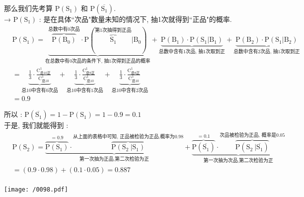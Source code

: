 \documentclass[UTF8]{ctexart}
\begin{document}
\begin{myEnvSample}
		那么我们先考算 $	\text{P}\left( \text{S}_1 \right) 	$ 和	$	\text{P}\left( \overline{\text{S}_1} \right) 	$. \\
		
		→ $	\text{P}\left( \text{S}_1 \right) 	$ : 是在具体``次品"数量未知的情况下, 抽1次就得到``正品"的概率. \\
		\begin{align*}  %
			&	\text{P}\left( \text{S}_1 \right) =\underset{\text{在总数中有0次品的条件下,\ 抽1次得到正品的概率}}{\underbrace{\overset{\text{总数中有0次品}}{\overbrace{\text{P}\left( \text{B}_0 \right) }}\cdot \text{P}\left( \overset{\text{第1次抽得到正品}}{\overbrace{\text{S}_1}}|\text{B}_0 \right) }}+\underset{\text{总数中含有1次品,\ 抽1次取到正}}{\underbrace{\text{P}\left( \text{B}_1 \right) \cdot \text{P}\left( \text{S}_1|\text{B}_1 \right) }}+\underset{\text{总数中含有2次品,\ 抽1次取到正}}{\underbrace{\text{P}\left( \text{B}_2 \right) \cdot \text{P}\left( \text{S}_1|\text{B}_2 \right) }}\\
			&=\underset{\text{总10中含有0次品}}{\underbrace{\frac{1}{3}\cdot \frac{\text{C}_{\text{总10正}}^{1}}{\text{C}_{\text{总}10}^{1}}}}+\underset{\text{总10中含有1次品}}{\underbrace{\frac{1}{3}\cdot \frac{\text{C}_{\text{总9正}}^{1}}{\text{C}_{\text{总}10}^{1}}}}+\underset{\text{总10中含有2次品}}{\underbrace{\frac{1}{3}\cdot \frac{\text{C}_{\text{总8正}}^{1}}{\text{C}_{\text{总}10}^{1}}}}\\
			&=0.9  
		\end{align*} 	
		
		所以 : $
		\text{P}\left( \overline{\text{S}_1} \right) =1-\text{P}\left( \text{S}_1 \right) =1-0.9=0.1
		$ \\
		
		于是, 我们就能得到 : \\
		\begin{align*}  %
			&\text{P}\left( \text{S}_2 \right) =\underset{\text{第一次抽为正品,第二次检验为正}}{\underbrace{\overset{=0.9}{\overbrace{\text{P}\left( \text{S}_1 \right) }}\cdot \overset{\text{从上面的表格中可知,\ 正品被检验为正品,概率为}0.98}{\overbrace{\text{P}\left( \text{S}_2\ |\text{S}_1 \right) }}}}+\underset{\text{第一次抽为次品,第二次检验为正}}{\underbrace{\overset{=0.1}{\overbrace{\text{P}\left( \overline{\text{S}_1} \right) }}\cdot \overset{\text{次品被检验为正品,\ 概率是}0.05}{\overbrace{\text{P}\left( \text{S}_2\ |\overline{\text{S}_1} \right) }}}}\\
			&=\left( 0.9\cdot 0.98 \right) +\left( 0.1\cdot 0.05 \right) =0.887\\
		\end{align*}
		
		\texttt{[image: /0098.pdf]}
	\end{myEnvSample}
	

	
	
	
\end{document}
